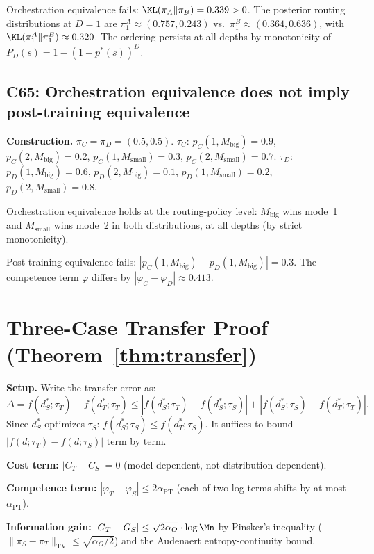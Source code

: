 Orchestration equivalence fails: $\KL(\pi_A \| \pi_B) = 0.339 > 0$.
The posterior routing distributions at $D{=}1$ are
$\pi_1^A \approx (0.757, 0.243)$ vs.\
$\pi_1^B \approx (0.364, 0.636)$,
with $\KL(\pi_1^A \| \pi_1^B) \approx 0.320$.
The ordering persists at all depths by monotonicity of
$P_D(s) = 1 - (1-p^*(s))^D$.

\subsection{C65: Orchestration equivalence does not imply post-training equivalence}

\textbf{Construction.}
$\pi_C = \pi_D = (0.5, 0.5)$.
$\tau_C$: $p_C(1, M_{\mathrm{big}}) = 0.9$,
  $p_C(2, M_{\mathrm{big}}) = 0.2$,
  $p_C(1, M_{\mathrm{small}}) = 0.3$,
  $p_C(2, M_{\mathrm{small}}) = 0.7$.
$\tau_D$: $p_D(1, M_{\mathrm{big}}) = 0.6$,
  $p_D(2, M_{\mathrm{big}}) = 0.1$,
  $p_D(1, M_{\mathrm{small}}) = 0.2$,
  $p_D(2, M_{\mathrm{small}}) = 0.8$.

Orchestration equivalence holds at the routing-policy level:
$M_{\mathrm{big}}$ wins mode~1 and $M_{\mathrm{small}}$ wins mode~2
in both distributions, at all depths (by strict monotonicity).

Post-training equivalence fails:
$|p_C(1, M_{\mathrm{big}}) - p_D(1, M_{\mathrm{big}})| = 0.3$.
The competence term $\varphi$ differs by $|\varphi_C - \varphi_D|
\approx 0.413$.

\section{Three-Case Transfer Proof (Theorem~\ref{thm:transfer})}
\label{app:transfer}

\textbf{Setup.}
Write the transfer error as:
\[
  \Delta = f(d_S^*; \tau_T) - f(d_T^*; \tau_T)
  \le |f(d_S^*; \tau_T) - f(d_S^*; \tau_S)|
    + |f(d_S^*; \tau_S) - f(d_T^*; \tau_T)|.
\]
Since $d_S^*$ optimizes $\tau_S$: $f(d_S^*; \tau_S) \le f(d_T^*; \tau_S)$.
It suffices to bound $|f(d; \tau_T) - f(d; \tau_S)|$ term by term.

\textbf{Cost term:} $|C_T - C_S| = 0$ (model-dependent, not
distribution-dependent).

\textbf{Competence term:}
$|\varphi_T - \varphi_S| \le 2\alpha_{\mathrm{PT}}$ (each of two
log-terms shifts by at most $\alpha_{\mathrm{PT}}$).

\textbf{Information gain:}
$|G_T - G_S| \le \sqrt{2\alpha_O} \cdot \log\Mn$ by Pinsker's inequality
($\|\pi_S - \pi_T\|_{\mathrm{TV}} \le \sqrt{\alpha_O/2}$) and the
Audenaert entropy-continuity bound.

